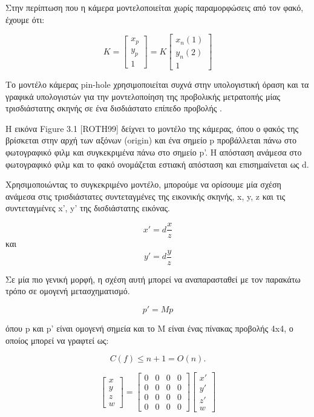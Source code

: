 Στην περίπτωση που η κάμερα μοντελοποιείται χωρίς παραμορφώσεις από τον φακό, έχουμε ότι:

\begin{equation}
K=
\begin{bmatrix}
x_{p}\\
y_{p}\\
1
\end{bmatrix}
=K
\begin{bmatrix}
x_{n}(1)\\
y_{n}(2)\\
1
\end{bmatrix}
\end{equation}


Το μοντέλο κάμερας pin-hole χρησιμοποιείται συχνά στην υπολογιστική όραση και τα γραφικά υπολογιστών για την μοντελοποίηση της προβολικής μετρατοπής μίας τρισδιάστατης σκηνής σε ένα δισδιάστατο επίπεδο προβολής \cite{hartley2003multiple} .

Η εικόνα Figure 3.1 [ROTH99] δείχνει το μοντέλο της κάμερας, όπου ο φακός της βρίσκεται στην αρχή των αξόνων (origin) και ένα σημείο p προβάλλεται πάνω στο φωτογραφικό φιλμ και συγκεκριμένα πάνω στο σημείο p'. Η απόσταση ανάμεσα στο φωτογραφικό φιλμ και το φακό ονομάζεται εστιακή απόσταση και επισημαίνεται ως d.


Χρησιμοποιώντας το συγκεκριμένο μοντέλο, μπορούμε να ορίσουμε μία σχέση ανάμεσα στις τρισδιάστατες συντεταγμένες της εικονικής σκηνής, x, y, z και τις συντεταγμένες x', y' της δισδιάστατης εικόνας. 

\[ x' = d  \frac{x}{z}\] και \[ y' = d  \frac{y}{z}\]

Σε μία πιο γενική μορφή, η σχέση αυτή μπορεί να αναπαρασταθεί με τον παρακάτω τρόπο σε ομογενή μετασχηματισμό.

\[ p' = Mp\] 

όπου p και p’ είναι ομογενή σημεία και το M είναι ένας πίνακας προβολής 4x4, ο οποίος μπορεί να γραφτεί ως:


\begin{equation}
C(f) \leq n + 1 = O(n).
\end{equation}


\begin{equation}
\begin{bmatrix}
x\\ 
y\\ 
z\\ 
w
\end{bmatrix}
=
\begin{bmatrix}
0 & 0 & 0 & 0 \\ 
0 & 0 & 0 & 0 \\ 
0 &  0  & 0  & 0 \\ 
0 & 0  & 0 & 0
\end{bmatrix}
\begin{bmatrix}
x'\\ 
y'\\ 
z'\\ 
w
\end{bmatrix}
\end{equation}


